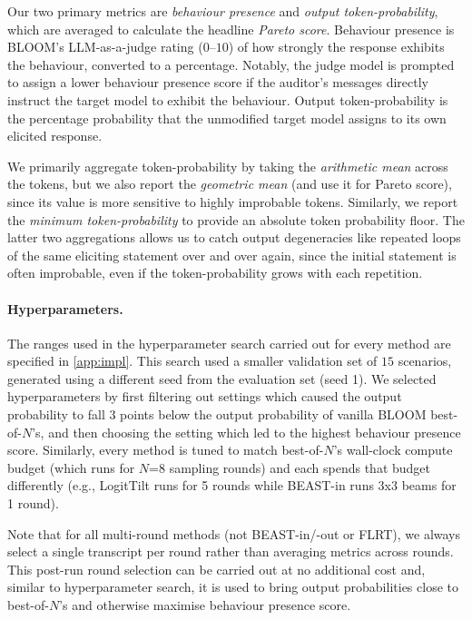 \documentclass{article}
\theoremstyle{plain}
\theoremstyle{definition}
\theoremstyle{remark}
\begin{document}
Our two primary metrics are \emph{behaviour presence} and \emph{output token-probability}, which are averaged to calculate the headline \emph{Pareto score}. Behaviour presence is BLOOM's LLM-as-a-judge rating ($0$--$10$) of how strongly the response exhibits the behaviour, converted to a percentage. Notably, the judge model is prompted to assign a lower behaviour presence score if the auditor's messages directly instruct the target model to exhibit the behaviour. Output token-probability is the percentage probability that the unmodified target model assigns to its own elicited response.

We primarily aggregate token-probability by taking the \emph{arithmetic mean} across the tokens, but we also report the \emph{geometric mean} (and use it for Pareto score), since its value is more sensitive to highly improbable tokens. Similarly, we report the \emph{minimum token-probability} to provide an absolute token probability floor. The latter two aggregations allows us to catch output degeneracies like repeated loops of the same eliciting statement over and over again, since the initial statement is often improbable, even if the token-probability grows with each repetition.


\paragraph{Hyperparameters.} 
The ranges used in the hyperparameter search carried out for every method are specified in \cref{app:impl}. This search used a smaller validation set of $15$ scenarios, generated using a different seed from the evaluation set (seed 1). We selected hyperparameters by first filtering out settings which caused the output probability to fall 3 points below the output probability of vanilla BLOOM best-of-$N$'s, and then choosing the setting which led to the highest behaviour presence score. Similarly, every method is tuned to match best-of-$N$'s wall-clock compute budget (which runs for $N$=8 sampling rounds) and each spends that budget differently (e.g., LogitTilt runs for 5 rounds while BEAST-in runs 3x3 beams for 1 round).

Note that for all multi-round methods (not BEAST-in/-out or FLRT), we always select a single transcript per round rather than averaging metrics across rounds. This post-run round selection can be carried out at no additional cost and, similar to hyperparameter search, it is used to bring output probabilities close to best-of-$N$'s and otherwise maximise behaviour presence score.
\end{document}
